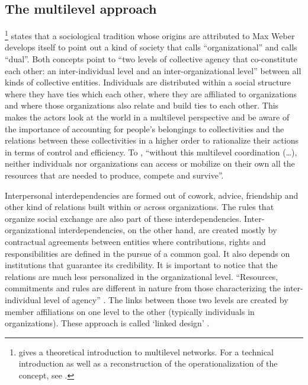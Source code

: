 \documentclass[a4paper, 12pt, openright, oneside, german, french, brazil, english]{abntex2}
\begin{document}
	

         \subsection{The multilevel approach}
	
        \footnote{ gives a theoretical introduction to multilevel networks. For a technical introduction as well as a reconstruction of the operationalization of the concept, see .} states that a sociological tradition whose  origins are attributed to Max Weber develops itself to point out a kind of society that  calls ``organizational'' and  calls ``dual''. Both concepts point to ``two levels of collective agency that co-constitute each other: an inter-individual level and an inter-organizational level'' \cite[p. 48]{lazega2016synchronization} between all kinds of collective entities. Individuals are distributed within a social structure where they have ties which each other, where they are affiliated to organizations and where those organizations also relate and build ties to each other. This makes the actors look at the world in a multilevel perspective and be aware of the importance of accounting for people's belongings to collectivities and the relations between these collectivities in a higher order to rationalize their actions in terms of control and efficiency. To , ``without this multilevel coordination (\dots), neither individuals nor organizations can access or mobilize on their own all the resources that are needed to produce, compete and survive''.

        Interpersonal interdependencies are formed out of cowork, advice, friendship and other kind of relations built within or across organizations. The rules that organize social exchange are also part of these interdependencies. Inter-organizational interdependencies, on the other hand, are created mostly by contractual agreements between entities where contributions, rights and responsibilities are defined in the pursue of a common goal. It also depends on institutions that guarantee its credibility. It is important to notice that the relations are much less personalized in the organizational level. ``Resources, commitments and rules are different in nature from those characterizing the inter-individual level of agency'' \cite[p. 49]{lazega2016synchronization}. The links between those two levels are created by member affiliations on one level to the other (typically individuals in organizations). These approach is called `linked design' \cite{lazega2008catching}. 
\end{document}
